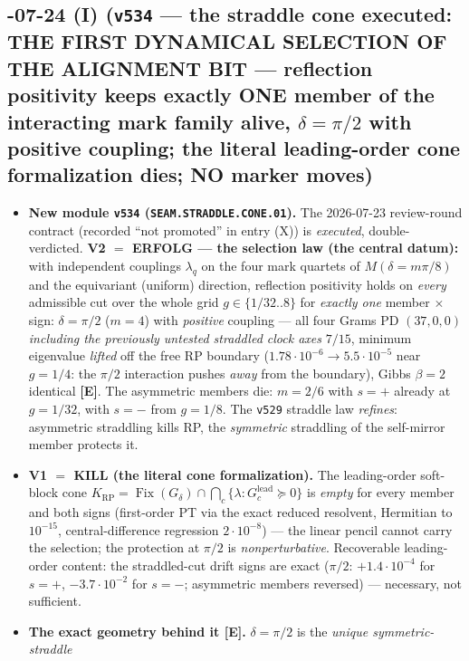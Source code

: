 \documentclass[11pt]{article}
\providecommand{\mE}{\textbf{[E]}}\providecommand{\mC}{\textbf{[C]}}
\providecommand{\vref}[1]{\texttt{#1}}
\begin{document}
\subsection*{-07-24 (I) (\texttt{v534} --- the straddle cone executed: THE FIRST DYNAMICAL SELECTION OF THE ALIGNMENT BIT --- reflection positivity keeps exactly ONE member of the interacting mark family alive, $\delta=\pi/2$ with positive coupling; the literal leading-order cone formalization dies; NO marker moves)}
\begin{itemize}[leftmargin=1.5em]
\item \textbf{New module \texttt{v534} (\texttt{SEAM.STRADDLE.CONE.01}).} The 2026-07-23 review-round
contract (recorded ``not promoted'' in entry (X)) is \emph{executed}, double-verdicted. \textbf{V2 $=$
ERFOLG --- the selection law (the central datum):} with independent couplings $\lambda_q$ on the four mark
quartets of $M(\delta=m\pi/8)$ and the equivariant (uniform) direction, reflection positivity holds on
\emph{every} admissible cut over the whole grid $g\in\{1/32..8\}$ for \emph{exactly one} member $\times$
sign: $\delta=\pi/2$ ($m=4$) with \emph{positive} coupling --- all four Grams PD $(37,0,0)$
\emph{including the previously untested straddled clock axes} $7/15$, minimum eigenvalue \emph{lifted} off
the free RP boundary ($1.78\cdot10^{-6}\to5.5\cdot10^{-5}$ near $g=1/4$: the $\pi/2$ interaction pushes
\emph{away} from the boundary), Gibbs $\beta=2$ identical \mE. The asymmetric members die: $m=2/6$ with
$s=+$ already at $g=1/32$, with $s=-$ from $g=1/8$. The \vref{v529} straddle law \emph{refines}:
asymmetric straddling kills RP, the \emph{symmetric} straddling of the self-mirror member protects it.
\item \textbf{V1 $=$ KILL (the literal cone formalization).} The leading-order soft-block cone
$K_{\mathrm{RP}}=\operatorname{Fix}(G_\delta)\cap\bigcap_c\{\lambda: G_c^{\mathrm{lead}}\succeq0\}$ is
\emph{empty} for every member and both signs (first-order PT via the exact reduced resolvent, Hermitian to
$10^{-15}$, central-difference regression $2\cdot10^{-8}$) --- the linear pencil cannot carry the
selection; the protection at $\pi/2$ is \emph{nonperturbative}. Recoverable leading-order content: the
straddled-cut drift signs are exact ($\pi/2$: $+1.4\cdot10^{-4}$ for $s=+$, $-3.7\cdot10^{-2}$ for $s=-$;
asymmetric members reversed) --- necessary, not sufficient.
\item \textbf{The exact geometry behind it \mE.} $\delta=\pi/2$ is the \emph{unique symmetric-straddle
}
\end{itemize}
\end{document}

